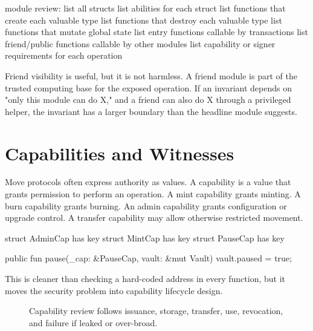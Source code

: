 \begin{codeblock}
module review:
    list all structs
    list abilities for each struct
    list functions that create each valuable type
    list functions that destroy each valuable type
    list functions that mutate global state
    list entry functions callable by transactions
    list friend/public functions callable by other modules
    list capability or signer requirements for each operation
\end{codeblock}

Friend visibility is useful, but it is not harmless. A friend module is part of the trusted computing base for the exposed operation. If an invariant depends on "only this module can do X," and a friend can also do X through a privileged helper, the invariant has a larger boundary than the headline module suggests.

\section{Capabilities and Witnesses}

Move protocols often express authority as values. A capability is a value that grants permission to perform an operation. A mint capability grants minting. A burn capability grants burning. An admin capability grants configuration or upgrade control. A transfer capability may allow otherwise restricted movement.

\begin{codeblock}
struct AdminCap has key {}
struct MintCap has key {}
struct PauseCap has key {}

public fun pause(_cap: &PauseCap, vault: &mut Vault) {
    vault.paused = true;
}
\end{codeblock}

This is cleaner than checking a hard-coded address in every function, but it moves the security problem into capability lifecycle design.

\begin{figure}[htbp]
\centering
{}
\caption{Capability review follows issuance, storage, transfer, use, revocation, and failure if leaked or over-broad.}
\end{figure}

